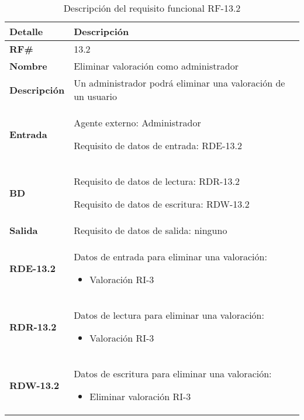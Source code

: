 \begin{table}[H]
    \centering
    \begin{tabular}{|p{3cm}|p{8cm}|}
        \hline
        \rowcolor{lightgray}
        \textbf{Detalle} & \textbf{Descripción} \\
        \hline
        \textbf{RF\#} & 13.2 \\
        \hline
        \textbf{Nombre} & Eliminar valoración como administrador \\
        \hline
        \textbf{Descripción} & Un administrador podrá eliminar una valoración de un usuario \\
        \hline
        \textbf{Entrada} &
        Agente externo: Administrador

        Requisito de datos de entrada: RDE-13.2 \\
        \hline
        \textbf{BD} &
        Requisito de datos de lectura: RDR-13.2

        Requisito de datos de escritura: RDW-13.2 \\
        \hline
        \textbf{Salida} & Requisito de datos de salida: ninguno \\
        \hline
        \textbf{RDE-13.2} & Datos de entrada para eliminar una valoración:
            \begin{itemize}
                \item Valoración RI-3
            \end{itemize} \\
        \hline
        \textbf{RDR-13.2} & Datos de lectura para eliminar una valoración:
            \begin{itemize}
                \item Valoración RI-3
            \end{itemize} \\
        \hline
        \textbf{RDW-13.2} & Datos de escritura para eliminar una valoración:
            \begin{itemize}
                \item Eliminar valoración RI-3
            \end{itemize} \\
        \hline
    \end{tabular}
    \caption{Descripción del requisito funcional RF-13.2}
    \label{tab:rf-13-2}
\end{table}

